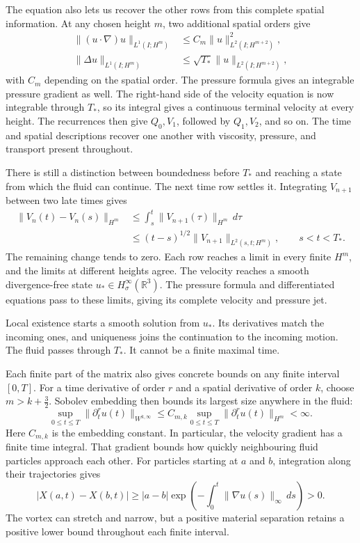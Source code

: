 The equation also lets us recover the other rows from this complete
spatial information. At any chosen height \(m\), two additional spatial
orders give
\[
 \begin{aligned}
 \|(u\cdot\nabla)u\|_{L^1(I;H^m)}
 &\le C_m\|u\|_{L^2(I;H^{m+2})}^2,\\
 \|\Delta u\|_{L^1(I;H^m)}
 &\le\sqrt{T_*}\|u\|_{L^2(I;H^{m+2})},
 \end{aligned}
\]
with \(C_m\) depending on the spatial order. The pressure formula gives
an integrable pressure gradient as well. The right-hand side of the
velocity equation is now integrable through \(T_*\), so its integral
gives a continuous terminal velocity at every height. The recurrences
then give \(Q_0,V_1\), followed by \(Q_1,V_2\), and so on.
The time and spatial descriptions recover one another with viscosity,
pressure, and transport present throughout.

There is still a distinction between boundedness before \(T_*\) and
reaching a state from which the fluid can continue. The next time row
settles it. Integrating \(V_{n+1}\) between two late times gives
\[
 \begin{aligned}
 \|V_n(t)-V_n(s)\|_{H^m}
 &\le\int_s^t\|V_{n+1}(\tau)\|_{H^m}\,d\tau\\
 &\le(t-s)^{1/2}\|V_{n+1}\|_{L^2(s,t;H^m)},
 \qquad s<t<T_*.
 \end{aligned}
\]
The remaining change tends to zero. Each row reaches a limit in every
finite \(H^m\), and the limits at different heights agree. The velocity
reaches a smooth divergence-free state
\(u_*\in H^\infty_\sigma(\mathbb R^3)\). The pressure formula and
differentiated equations pass to these limits, giving its complete velocity
and pressure jet.

Local existence starts a smooth solution from \(u_*\). Its derivatives
match the incoming ones, and uniqueness joins the continuation to the
incoming motion. The fluid passes through \(T_*\). It cannot be a
finite maximal time.

\label{u:guide:finite-estimates}
Each finite part of the matrix also gives concrete bounds on any finite
interval \([0,T]\). For a time
derivative of order \(r\) and a spatial derivative of order \(k\), choose
\(m>k+\tfrac32\). Sobolev embedding then bounds its largest size
anywhere in the fluid:
\[
 \sup_{0\le t\le T}\|\partial_t^ru(t)\|_{W^{k,\infty}}
 \le C_{m,k}\sup_{0\le t\le T}\|\partial_t^ru(t)\|_{H^m}<\infty.
\]
Here \(C_{m,k}\) is the embedding constant. In particular, the velocity
gradient has a finite time integral. That gradient bounds how quickly
neighbouring fluid particles approach each other. For particles starting
at \(a\) and \(b\), integration along their trajectories gives
\[
 |X(a,t)-X(b,t)|\ge |a-b|
 \exp\!\left(-\int_0^t\|\nabla u(s)\|_\infty\,ds\right)>0.
\]
The vortex can stretch and narrow, but a positive material separation
retains a positive lower bound throughout each finite interval.

